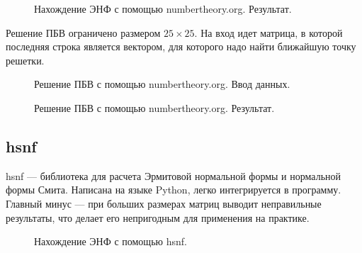 \begin{figure}[H]
\caption{Нахождение ЭНФ с помощью numbertheory.org. Результат.}
\label{fig:HNF_NT_RESULT}
\end{figure}

Решение ПБВ ограничено размером $ 25 \times 25 $. На вход идет матрица, в которой последняя строка является вектором, для которого надо найти ближайшую точку решетки. 

\begin{figure}[H]
\caption{Решение ПБВ с помощью numbertheory.org. Ввод данных.}
\label{fig:CVP_NT_INPUT}
\end{figure}

\begin{figure}[H]
\caption{Решение ПБВ с помощью numbertheory.org. Результат.}
\label{fig:HNF_NT_RESULT}
\end{figure}

\subsection{hsnf}

hsnf --- библиотека для расчета Эрмитовой нормальной формы и нормальной формы Смита\cite{hsnf}. Написана на языке Python, легко интегрируется в программу. Главный минус --- при больших размерах матриц выводит неправильные результаты, что делает его непригодным для применения на практике.

\begin{figure}[H]
\caption{Нахождение ЭНФ с помощью hsnf.}
\label{fig:HNF_NT_RESULT}
\end{figure}


\clearpage
